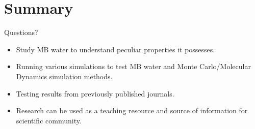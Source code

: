 \documentclass{beamer}
\begin{document}
\section{Summary}
\begin{frame}{Questions?}
\begin{itemize}
  \item Study MB water to understand peculiar properties it possesses.
  \item Running various simulations to test MB water and Monte Carlo/Molecular Dynamics simulation methods.
  \item Testing results from previously published journals.
  \item Research can be used as a teaching resource and source of information for scientific community.
\end{itemize}
\end{frame}
\end{document}
